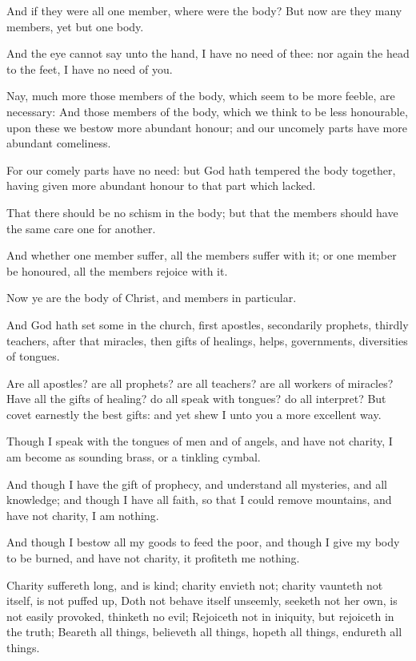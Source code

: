 \Verse And if they were all one member, where were the body?  \Verse But now are they many members, yet but one body.

\Verse And the eye cannot say unto the hand, I have no need of thee: nor again the head to the feet, I have no need of you.

\Verse Nay, much more those members of the body, which seem to be more feeble, are necessary: \Verse And those members of the body, which we think to be less honourable, upon these we bestow more abundant honour; and our uncomely parts have more abundant comeliness.

\Verse For our comely parts have no need: but God hath tempered the body together, having given more abundant honour to that part which lacked.

\Verse That there should be no schism in the body; but that the members should have the same care one for another.

\Verse And whether one member suffer, all the members suffer with it; or one member be honoured, all the members rejoice with it.

\Verse Now ye are the body of Christ, and members in particular.

\Verse And God hath set some in the church, first apostles, secondarily prophets, thirdly teachers, after that miracles, then gifts of healings, helps, governments, diversities of tongues.

\Verse Are all apostles? are all prophets? are all teachers? are all workers of miracles?  \Verse Have all the gifts of healing? do all speak with tongues? do all interpret?  \Verse But covet earnestly the best gifts: and yet shew I unto you a more excellent way.


\Chapter
\Verse Though I speak with the tongues of men and of angels, and have not charity, I am become as sounding brass, or a tinkling cymbal.

\Verse And though I have the gift of prophecy, and understand all mysteries, and all knowledge; and though I have all faith, so that I could remove mountains, and have not charity, I am nothing.

\Verse And though I bestow all my goods to feed the poor, and though I give my body to be burned, and have not charity, it profiteth me nothing.

\Verse Charity suffereth long, and is kind; charity envieth not; charity vaunteth not itself, is not puffed up, \Verse Doth not behave itself unseemly, seeketh not her own, is not easily provoked, thinketh no evil; \Verse Rejoiceth not in iniquity, but rejoiceth in the truth; \Verse Beareth all things, believeth all things, hopeth all things, endureth all things.


